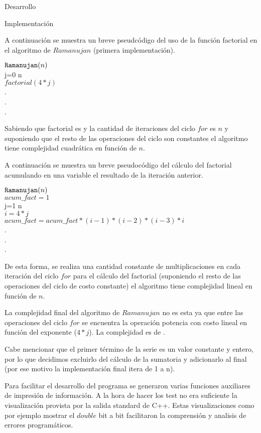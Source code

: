 \begin{section}{Desarrollo}
\begin{subsection}{Implementación}
\begin{itemize}
		A continuación se muestra un breve pseudcódigo del uso de la función factorial en el algoritmo de $Ramanujan$ (primera implementación).
		
		$\texttt{Ramanujan}(n)$\\
		\tab\FOR j=0 \TO n\\
		\tab\tab$factorial(4*j)$\\
		\tab\tab\tab.\\
		\tab\tab\tab.\\
		\tab\tab\tab.\\
		\tab\END
		
		\VSP
		
		Sabiendo que factorial es  y la cantidad de iteraciones del ciclo $for$ es $n$ y suponiendo que el resto de las operaciones del ciclo son constantes el algoritmo tiene complejidad cuadrática en función de $n$.\VSP

		A continuación se muestra un breve pseudocódigo del cálculo del factorial acumulando en una variable el resultado de la iteración anterior.\VSP
		
		$\texttt{Ramanujan}(n)$\\
		\tab $acum\_fact=1$\\
		\tab\FOR j=1 \TO n\\
		\tab\tab $i = 4*j$\\
		\tab\tab$acum\_fact = acum\_fact*(i-1)*(i-2)*(i-3)*i$\\
		\tab\tab\tab.\\
		\tab\tab\tab.\\
		\tab\tab\tab.\\
		\tab\END
		
		\VSP
		
		De esta forma, se realiza una cantidad constante de multiplicaciones en cada iteración del ciclo $for$ para el cálculo del factorial (suponiendo el resto de las operaciones del ciclo de costo constante) el algoritmo tiene complejidad lineal en función de $n$.
		
		La complejidad final del algoritmo de $Ramanujan$ no es esta ya que entre las operaciones del ciclo $for$ se encuentra la operación potencia con costo lineal en función del exponente ($4*j$). La complejidad es de .
		
		Cabe mencionar que el primer término de la serie es un valor constante y entero, por lo que decidimos excluirlo del cálculo de la sumatoria y adicionarlo al final (por ese motivo la implementación final itera de 1 a n).
		\end{itemize}
		
		Para facilitar el desarrollo del programa se generaron varias funciones auxiliares de impresión de información. A la hora de hacer los test no era suficiente la visualización provista por la salida standard de C++. Estas visualizaciones como por ejemplo mostrar el $double$ bit a bit facilitaron la comprensión y analisis de errores programáticos.
		
	\end{subsection}
\end{section}
